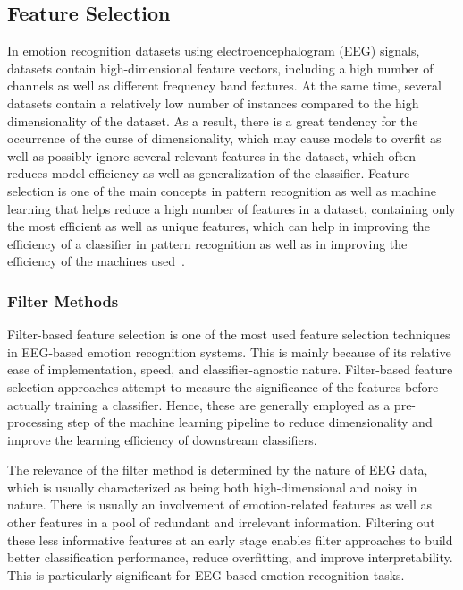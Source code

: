 \documentclass{WileyMSP-template}
\begin{document}
\subsection{Feature Selection}
In emotion recognition datasets using electroencephalogram (EEG) signals, datasets contain high-dimensional feature vectors, including a high number of channels as well as different frequency band features. At the same time, several datasets contain a relatively low number of instances compared to the high dimensionality of the dataset. As a result, there is a great tendency for the occurrence of the curse of dimensionality, which may cause models to overfit as well as possibly ignore several relevant features in the dataset, which often reduces model efficiency as well as generalization of the classifier. Feature selection is one of the main concepts in pattern recognition as well as machine learning that helps reduce a high number of features in a dataset, containing only the most efficient as well as unique features, which can help in improving the efficiency of a classifier in pattern recognition as well as in improving the efficiency of the machines used~\cite{hamzah2024heliyon}.

\subsubsection{Filter Methods}
Filter-based feature selection is one of the most used feature selection techniques in EEG-based emotion recognition systems. This is mainly because of its relative ease of implementation, speed, and classifier-agnostic nature. Filter-based feature selection approaches attempt to measure the significance of the features before actually training a classifier. Hence, these are generally employed as a pre-processing step of the machine learning pipeline to reduce dimensionality and improve the learning efficiency of downstream classifiers.

The relevance of the filter method is determined by the nature of EEG data, which is usually characterized as being both high-dimensional and noisy in nature. There is usually an involvement of emotion-related features as well as other features in a pool of redundant and irrelevant information. Filtering out these less informative features at an early stage enables filter approaches to build better classification performance, reduce overfitting, and improve interpretability. This is particularly significant for EEG-based emotion recognition tasks.
\end{document}
